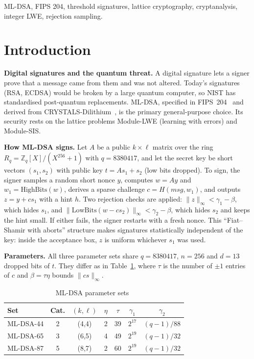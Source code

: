 \documentclass[10pt,conference,a4paper]{IEEEtran}
\newcommand{\HB}{\mathrm{HighBits}}
\newcommand{\LB}{\mathrm{LowBits}}
\newcommand{\norm}[1]{\lVert #1 \rVert_\infty}
\begin{document}
\begin{IEEEkeywords}
ML-DSA, FIPS 204, threshold signatures, lattice cryptography, cryptanalysis, integer LWE, rejection sampling.
\end{IEEEkeywords}

\section{Introduction}

\textbf{Digital signatures and the quantum threat.} A digital signature lets a signer prove that a message came from them
and was not altered. Today's signatures (RSA, ECDSA) would be broken by a large quantum computer, so NIST has
standardised post-quantum replacements. ML-DSA, specified in FIPS~204~\cite{fips204} and derived from
CRYSTALS-Dilithium~\cite{dilithium}, is the primary general-purpose choice. Its security rests on the lattice problems
Module-LWE (learning with errors) and Module-SIS.

\textbf{How ML-DSA signs.} Let $A$ be a public $k\times\ell$ matrix over the ring $R_q=\mathbb{Z}_q[X]/(X^{256}+1)$ with
$q=8380417$, and let the secret key be short vectors $(s_1,s_2)$ with public key $t=As_1+s_2$ (low bits dropped). To sign,
the signer samples a random short nonce $y$, computes $w=Ay$ and $w_1=\HB(w)$, derives a sparse challenge
$c=H(\mathit{msg},w_1)$, and outputs $z=y+cs_1$ with a hint $h$. Two rejection checks are applied:
$\norm{z}<\gamma_1-\beta$, which hides $s_1$, and $\norm{\LB(w-cs_2)}<\gamma_2-\beta$, which hides $s_2$ and keeps the hint
small. If either fails, the signer restarts with a fresh nonce. This ``Fiat--Shamir with aborts'' structure makes
signatures statistically independent of the key: inside the acceptance box, $z$ is uniform whichever $s_1$ was used.

\textbf{Parameters.} All three parameter sets share $q=8380417$, $n=256$ and $d=13$ dropped bits of $t$. They differ as in
Table~\ref{tab:params}, where $\tau$ is the number of $\pm1$ entries of $c$ and $\beta=\tau\eta$ bounds $\norm{cs}$.

\begin{table}[t]
\caption{ML-DSA parameter sets~\cite{fips204}}\label{tab:params}
\centering\footnotesize
\begin{tabular}{@{}lcccccc@{}}
\toprule
Set & Cat. & $(k,\ell)$ & $\eta$ & $\tau$ & $\gamma_1$ & $\gamma_2$\\
\midrule
ML-DSA-44 & 2 & (4,4) & 2 & 39 & $2^{17}$ & $(q-1)/88$\\
ML-DSA-65 & 3 & (6,5) & 4 & 49 & $2^{19}$ & $(q-1)/32$\\
ML-DSA-87 & 5 & (8,7) & 2 & 60 & $2^{19}$ & $(q-1)/32$\\
\bottomrule
\end{tabular}
\end{table}
\end{document}
